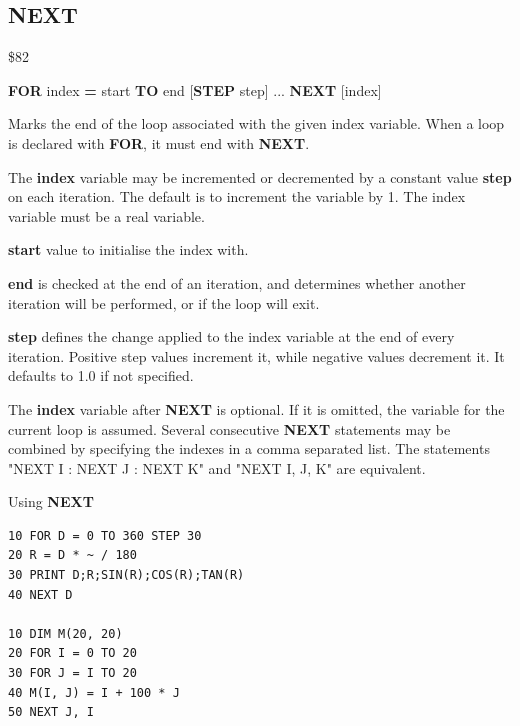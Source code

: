 \subsection{NEXT}
\begin{description}[leftmargin=2cm,style=nextline]
\item [Token:]    \$82

\item [Format:]   {\bf FOR} index {\bf =} start {\bf TO} end [{\bf STEP} step] ... {\bf NEXT} [index]

\item [Usage:]    Marks the end of the loop associated with the given index variable. When a loop is declared with {\bf FOR}, it must end with {\bf NEXT}.

                  The {\bf index} variable may be incremented or decremented by a constant value {\bf step} on each iteration. The default is to increment the variable by 1. The index variable must be a real variable.

                  {\bf start} value to initialise the index with.

                  {\bf end} is checked at the end of an iteration, and determines whether another iteration will be performed, or if the loop will exit.

                  {\bf step} defines the change applied to the index variable at the end of every iteration. Positive step values increment it, while negative values decrement it. It defaults to 1.0 if not specified.

\item [Remarks:]  The {\bf index} variable after {\bf NEXT} is optional. If it is omitted, the variable for the current loop is assumed. Several consecutive {\bf NEXT} statements may be combined by specifying the indexes in a comma separated list. The statements "NEXT I : NEXT J : NEXT K" and "NEXT I, J, K" are equivalent.

\item [Examples:] Using {\bf NEXT}

\begin{tcolorbox}[colback=black,coltext=white]
\verbatimfont{\codefont}
\begin{verbatim}
10 FOR D = 0 TO 360 STEP 30
20 R = D * ~ / 180
30 PRINT D;R;SIN(R);COS(R);TAN(R)
40 NEXT D

10 DIM M(20, 20)
20 FOR I = 0 TO 20
30 FOR J = I TO 20
40 M(I, J) = I + 100 * J
50 NEXT J, I
\end{verbatim}
\end{tcolorbox}
\end{description}

